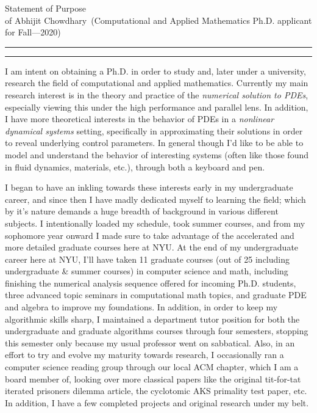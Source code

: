 \documentclass[11pt]{article}
\newcommand{\soptitle}{Statement of Purpose}
\newcommand{\yourname}{Abhijit Chowdhary}
\begin{document}
\begin{center}\LARGE\soptitle\\
\normalsize of \yourname\ (Computational and Applied Mathematics Ph.D. applicant for Fall---2020)
\end{center}

\hrule
\vspace{1pt}
\hrule height 1pt

\bigskip

I am intent on obtaining a Ph.D. in order to study and, later under
a university, research the field of computational and applied mathematics.
Currently my main research interest is in the theory and practice of the {\em
numerical solution to PDEs}, especially viewing this under the high performance
and parallel lens. In addition, I have more theoretical interests in the
behavior of PDEs in a {\em nonlinear dynamical systems} setting, specifically in
approximating their solutions in order to reveal underlying control parameters.
In general though I'd like to be able to model and understand the behavior of
interesting systems (often like those found in fluid dynamics, materials, etc.),
through both a keyboard and pen.

I began to have an inkling towards these interests early in my undergraduate
career, and since then I have madly dedicated myself to learning the field;
which by it's nature demands a huge breadth of background in various different
subjects. I intentionally loaded my schedule, took summer courses, and from my
sophomore year onward I made sure to take advantage of the accelerated and more
detailed graduate courses here at NYU. At the end of my undergraduate career
here at NYU, I'll have taken 11 graduate courses (out of 25 including
undergraduate \& summer courses) in computer science and math, including
finishing the numerical analysis sequence offered for incoming Ph.D. students,
three advanced topic seminars in computational math topics, and graduate PDE and
algebra to improve my foundations. In addition, in order to keep my algorithmic
skills sharp, I maintained a department tutor position for both the
undergraduate and graduate algorithms courses through four semesters, stopping
this semester only because my usual professor went on sabbatical. Also, in an
effort to try and evolve my maturity towards research, I occasionally ran
a computer science reading group through our local ACM chapter, which I am
a board member of, looking over more classical papers like the original
tit-for-tat iterated prisoners dilemma article, the cyclotomic AKS primality
test paper, etc. In addition, I have a few completed projects and original
research under my belt.
\end{document}
